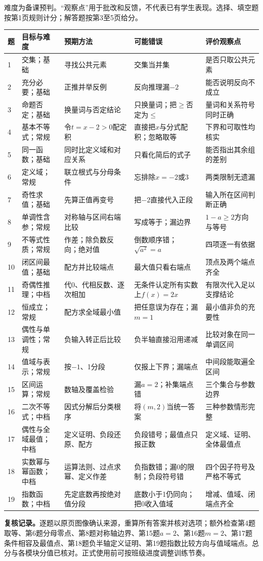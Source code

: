 \newpage
{}
难度为备课预判。“观察点”用于批改和反馈，不代表已有学生表现。选择、填空题按第1页规则计分；解答题按第3至5页给分。
{\small\setlength{\tabcolsep}{3pt}
\begin{longtable}{@{}p{.04\linewidth}>{\raggedright\arraybackslash}p{.17\linewidth}>{\raggedright\arraybackslash}p{.22\linewidth}>{\raggedright\arraybackslash}p{.28\linewidth}>{\raggedright\arraybackslash}p{.17\linewidth}@{}}
\toprule 题 & 目标与难度 & 预期方法 & 可能错误 & 评价观察点\\\midrule\endhead
1 & 交集；基础 & 寻找公共元素 & 交集当并集 & 是否只取公共元素\\
2 & 充分必要；基础 & 正推并举反例 & 反向推理漏$-2$ & 能否说明反向不成立\\
3 & 命题否定；基础 & 换量词与否定结论 & 只换量词；把$\ge$否定为$\le$ & 量词和关系符号同时正确\\
4 & 基本不等式；常规 & 令$t=x-2>0$配定积 & 直接把$x$与分式配积；忽略取等 & 下界和可取性均核实\\
5 & 同一函数；基础 & 同时比定义域和对应关系 & 只看化简后的式子 & 能否指出其余组的差别\\
6 & 定义域；常规 & 联立根式与分母条件 & 忘排除$x=-2$或3 & 两类限制无遗漏\\
7 & 奇性求值；基础 & 先算正值再变号 & 把$-2$直接代入正段 & 输入所在区间判断正确\\
8 & 单调性含参；常规 & 对称轴与区间右端比较 & 写成等于；漏边界 & $1-a\ge2$方向与等号\\
9 & 不等式性质；常规 & 作差；除负数反向；绝对值 & 倒数顺序错；$\sqrt{a^2}=a$ & 四项逐一有依据\\
10 & 闭区间最值；基础 & 配方并比较端点 & 最大值只看右端点 & 顶点及两个端点齐全\\
11 & 奇偶性推理；中档 & 代0、代相反数、逐次相加 & 无条件认定所有实数上$f(x)=2x$ & 有限次代入足以支撑结论\\
12 & 恒成立；常规 & 配方求全域最小值 & 把任意误为存在；漏$m=1$ & 最小值非负的充要性\\
13 & 偶性与单调性；常规 & 负输入转正后比较 & 负半轴直接沿用递减 & 比较对象在同一单调区间\\
14 & 值域与表示；常规 & 按$-1$、1分段 & 仅报上下界；漏端点 & 中间段能取遍全区间\\
15 & 区间运算；常规 & 数轴及覆盖检验 & 漏$a=2$；补集端点错 & 三个集合与参数边界\\
16 & 二次不等式；中档 & 因式分解后分类根序 & 将$(m,2)$当统一答案 & 三种参数情形完整\\
17 & 偶性与全域最值；中档 & 定义证明、负段还原、配方 & 负段错号；最值点只报正数 & 定义域、证明、全体最值点\\
18 & 实数幂与幂函数；中档 & 运算法则、过点求幂、定义作差 & 负指数错；漏0的限制；负段符号错 & 四个因子符号及严格不等式\\
19 & 指数函数；中档 & 先定底数再按绝对值分段 & 底数小于1仍同向；把0收入值域 & 增减、值域、闭端点齐全\\
\bottomrule
\end{longtable}}

\textbf{复核记录。}逐题以原页图像确认来源，重算所有答案并核对选项；额外检查第4题取等、第6题分母零点、第8题对称轴边界、第15题$a=2$、第16题$m=2$、第17题条件相容及最值点、第18题负半轴定义证明、第19题指数比较方向与值域端点。总分与各模块分值已核对。正式使用前可按班级进度调整训练节奏。

